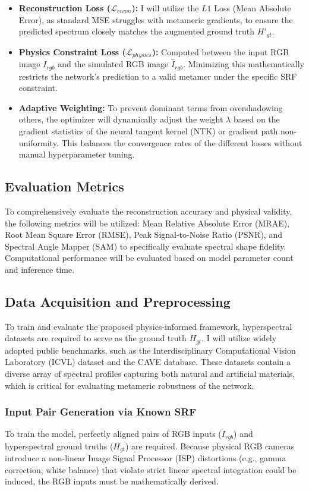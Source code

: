 \documentclass[stu]{apa7}
\begin{document}
\begin{itemize}
    \item \textbf{Reconstruction Loss ($\mathcal{L}_{recon}$):} I will utilize the $L1$ Loss (Mean Absolute Error), as standard MSE struggles with metameric gradients, to ensure the predicted spectrum closely matches the augmented ground truth $H'_{gt}$.
    \item \textbf{Physics Constraint Loss ($\mathcal{L}_{physics}$):} Computed between the input RGB image $I_{rgb}$ and the simulated RGB image $\hat{I}_{rgb}$. Minimizing this mathematically restricts the network's prediction to a valid metamer under the specific SRF constraint.
    \item \textbf{Adaptive Weighting:} To prevent dominant terms from overshadowing others, the optimizer will dynamically adjust the weight $\lambda$ based on the gradient statistics of the neural tangent kernel (NTK) or gradient path non-uniformity. This balances the convergence rates of the different losses without manual hyperparameter tuning.
\end{itemize}

\subsection{Evaluation Metrics}
To comprehensively evaluate the reconstruction accuracy and physical validity, the following metrics will be utilized: Mean Relative Absolute Error (MRAE), Root Mean Square Error (RMSE), Peak Signal-to-Noise Ratio (PSNR), and Spectral Angle Mapper (SAM) to specifically evaluate spectral shape fidelity. Computational performance will be evaluated based on model parameter count and inference time.

\subsection{Data Acquisition and Preprocessing}

To train and evaluate the proposed physics-informed framework, hyperspectral datasets are required to serve as the ground truth $H_{gt}$. I will utilize widely adopted public benchmarks, such as the Interdisciplinary Computational Vision Laboratory (ICVL) dataset and the CAVE database. These datasets contain a diverse array of spectral profiles capturing both natural and artificial materials, which is critical for evaluating metameric robustness of the network.

\subsubsection{Input Pair Generation via Known SRF}
To train the model, perfectly aligned pairs of RGB inputs ($I_{rgb}$) and hyperspectral ground truths ($H_{gt}$) are required. Because physical RGB cameras introduce a non-linear Image Signal Processor (ISP) distortions (e.g., gamma correction, white balance) that violate strict linear spectral integration could be induced, the RGB inputs must be mathematically derived. 
\end{document}
